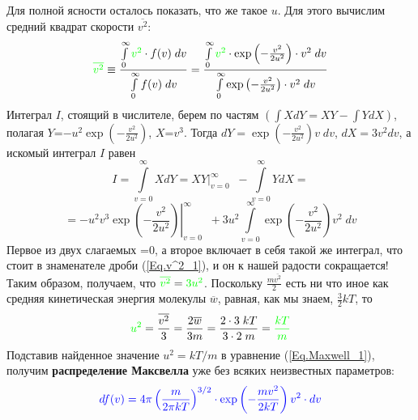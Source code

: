 Для полной ясности осталось показать, что же такое $u$. Для этого вычислим средний квадрат скорости {\color{green}$\overline{v^2}$}:
\begin{equation}\label{Eq.v^2_1}
{\color{green}\overline{v^2}}\equiv\frac{\int\limits_0^\infty {\color{green}v^2}\cdot f(v)\;dv}
                         {\int\limits_0^\infty f(v)\;dv}=
\frac{\int\limits_0^\infty {\color{green}v^2}\cdot\exp\left(-\frac{v^2}{2u^2}\right) \cdot v^2\;dv}
                         {\int\limits_0^\infty \exp\left(-\frac{v^2}{2u^2}\right) \cdot v^2\;dv}
\end{equation}
Интеграл $I$, стоящий в числителе, берем по частям $\left(\int XdY=XY-\int YdX\right)$, полагая $Y$=$-u^2\exp\left(-\frac{v^2}{2u^2}\right)$, $X$=$v^3$. Тогда $dY=\exp\left(-\frac{v^2}{2u^2}\right)v\;dv$, $dX=3v^2dv$, а искомый интеграл $I$ равен
\begin{displaymath}
I=\int\limits_{v=0}^\infty XdY = \left.XY\right|_{v=0}^\infty\;\;-\int\limits_{v=0}^\infty YdX =
\end{displaymath}
\begin{displaymath}
 =\left.-u^2v^3\exp\left(-\frac{v^2}{2u^2}\right)\right|_{v=0}^\infty\;\;
 +3u^2\int\limits_{v=0}^\infty\exp\left(-\frac{v^2}{2u^2}\right)v^2\;dv
\end{displaymath}
Первое из двух слагаемых =0, а второе включает в себя такой же интеграл, что стоит в знаменателе дроби (\ref{Eq.v^2_1}), и он к нашей радости сокращается! Таким образом, получаем, что ${\color{green}\overline{v^2}}={\color{green}3u^2}$. Поскольку $\frac{m\overline{v^2}}2$ есть ни что иное как средняя кинетическая энергия молекулы $\overline{w}$, равная, как мы знаем, $\frac32kT$, то
\begin{equation}
{\color{green}u^2}=\frac{\overline{v^2}}3=\frac{2\overline{w}}{3m}= \frac{2\cdot3\;kT}{3\cdot2\;m}={\color{green}\frac{kT}m}
\end{equation}
Подставив найденное значение $u^2=kT/m$ в уравнение (\ref{Eq.Maxwell_1}), получим {\color{blue}\bf распределение Максвелла} уже без всяких неизвестных параметров:
\begin{equation}{\color{blue}
df(v)= 4\pi\left(\frac{m}{2\pi kT}\right)^{3/2}\cdot \exp\left(-\frac{mv^2}{2kT}\right)v^2\cdot dv
}
\end{equation}

